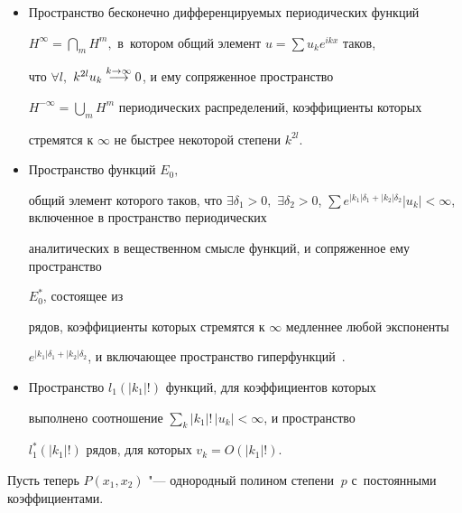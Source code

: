\begin{itemize}



\item[1.] Пространство бесконечно дифференцируемых периодических функций 

$H^\infty =

{\bigcap_m} H^m,$ в~котором общий элемент $u = \sum u_k e^{i k x}$ таков,

что $\forall l,$ $ k^{2 l} u_k \overset {\scriptsize k \to

\infty}{\longrightarrow} 0$, и ему сопряженное пространство 

$H^{-\infty}=

{\bigcup_m} H^m$ периодических распределений, коэффициенты которых

стремятся к $\infty$ не быстрее некоторой степени $k^{2 l}$.





\item[2.]  Пространство функций $E_0,$

общий элемент которого таков, что $\exists \delta_1

>0,$ $ \exists \delta_2 > 0$, $ \sum e^{|k_1| \delta_1 + |k_2|

\delta_2} |u_k| < \infty$, включенное в пространство периодических

аналитических  в вещественном смысле функций, и сопряженное ему пространство

$E_0^*$, состоящее из

рядов, коэффициенты которых стремятся к $\infty$ медленнее любой экспоненты

$e^{|k_1| \delta_1 + |k_2| \delta_2}$, и включающее пространство гиперфункций~\cite{bur:6}.





\item[3.]   Пространство $l_1 (|k_1 |!)$ функций, для коэффициентов которых

выполнено соотношение $\sum_k |k_1 |! \, |u_k | < \infty$, и пространство

$l_1^* (|k_1| !)$ рядов, для которых $v_k = O (|k_1| !)$.

\medskip





\end{itemize}



Пусть  теперь $ P (x_1, x_2)$ "---  однородный  полином  степени $\ p $  с~постоянными  коэффициентами. 


